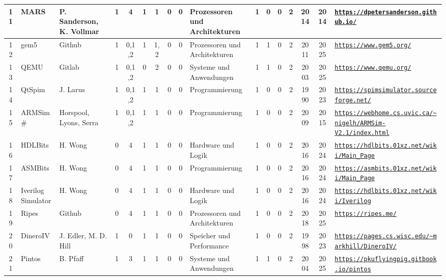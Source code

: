 \begin{landscape}
\begin{longtable}{|c|p{1cm}|p{1.3cm}|c|c|c|c|c|c|p{1.3cm}|c|c|c|c|c|c|p{2cm}|}
    11 & MARS & P. Sanderson, K. Vollmar & 1 & 4 & 1 & 1 & 0 & 0 & Prozessoren und Architekturen & 1 & 0 & 0 & 2 & 2014 & 2014 & \href{https://dpetersanderson.github.io/}{\nolinkurl{https://dpetersanderson.github.io/}} \\ \hline
    12 & gem5 & Github & 1 & 0,1,2 & 1 & 1,2 & 0 & 0 & Prozessoren und Architekturen & 1 & 1 & 0 & 2 & 2011 & 2025 & \href{https://www.gem5.org/}{\nolinkurl{https://www.gem5.org/}} \\ \hline
    13 & QEMU & Gitlab & 1 & 0,1,2 & 0 & 2 & 0 & 0 & Systeme und Anwendungen & 1 & 1 & 0 & 2 & 2003 & 2025 & \href{https://www.qemu.org/}{\nolinkurl{https://www.qemu.org/}} \\ \hline
    14 & QtSpim & J. Larus & 1 & 0,1,2 & 1 & 1 & 0 & 0 & Programmierung & 1 & 0 & 0 & 2 & 1990 & 2023 & \href{https://spimsimulator.sourceforge.net/}{\nolinkurl{https://spimsimulator.sourceforge.net/}} \\ \hline
    15 & ARMSim\# & Horspool, Lyons, Serra & 1 & 0,1,2 & 1 & 1 & 0 & 0 & Programmierung & 1 & 0 & 0 & 2 & 2009 & 2015 & \href{https://webhome.cs.uvic.ca/\~nigelh/ARMSim-V2.1/index.html}{\nolinkurl{https://webhome.cs.uvic.ca/\~nigelh/ARMSim-V2.1/index.html}} \\ \hline
    16 & HDLBits & H. Wong & 0 & 4 & 1 & 1 & 0 & 0 & Hardware und Logik & 1 & 0 & 0 & 2 & 2016 & 2024 & \href{https://hdlbits.01xz.net/wiki/Main\_Page}{\nolinkurl{https://hdlbits.01xz.net/wiki/Main\_Page}} \\ \hline
    17 & ASMBits & H. Wong & 0 & 4 & 1 & 1 & 0 & 0 & Programmierung & 1 & 0 & 0 & 2 & 2016 & 2024 & \href{https://asmbits.01xz.net/wiki/Main\_Page}{\nolinkurl{https://asmbits.01xz.net/wiki/Main\_Page}} \\ \hline
    18 & Iverilog Simulator & H. Wong & 0 & 4 & 1 & 1 & 0 & 0 & Hardware und Logik & 1 & 0 & 0 & 2 & 2016 & 2024 & \href{https://hdlbits.01xz.net/wiki/Iverilog}{\nolinkurl{https://hdlbits.01xz.net/wiki/Iverilog}} \\ \hline
    19 & Ripes & Github & 0 & 4 & 1 & 1 & 0 & 0 & Prozessoren und Architekturen & 1 & 0 & 0 & 2 & 2018 & 2025 & \href{https://ripes.me/}{\nolinkurl{https://ripes.me/}} \\ \hline
    20 & DineroIV & J. Edler, M. D. Hill & 1 & 0 & 1 & 1 & 0 & 0 & Speicher und Performance & 1 & 0 & 0 & 2 & 1998 & 2023 & \href{https://pages.cs.wisc.edu/\~markhill/DineroIV/}{\nolinkurl{https://pages.cs.wisc.edu/\~markhill/DineroIV/}} \\ \hline
    21 & Pintos & B. Pfaff & 1 & 3 & 1 & 1 & 0 & 0 & Systeme und Anwendungen & 1 & 1 & 0 & 2 & 2004 & 2025 & \href{https://pkuflyingpig.gitbook.io/pintos}{\nolinkurl{https://pkuflyingpig.gitbook.io/pintos}} \\ \hline

\end{longtable}
\end{landscape}
